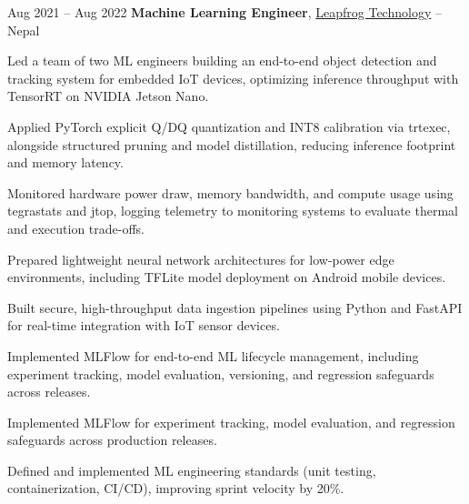         \vspace{0.12 cm}
        \begin{twocolentry}{
            Aug 2021 – Aug 2022
        }
            \textbf{Machine Learning Engineer}, \href{https://www.lftechnology.com/}{Leapfrog Technology} -- Nepal\end{twocolentry}
        \vspace{0.06 cm}
        \begin{onecolentry}
            \begin{highlights}
                \item Led a team of two ML engineers building an end-to-end object detection and tracking system for embedded IoT devices, optimizing inference throughput with TensorRT on NVIDIA Jetson Nano.
                \item Applied PyTorch explicit Q/DQ quantization and INT8 calibration via trtexec, alongside structured pruning and model distillation, reducing inference footprint and memory latency.
                \item Monitored hardware power draw, memory bandwidth, and compute usage using tegrastats and jtop, logging telemetry to monitoring systems to evaluate thermal and execution trade-offs.
                \item Prepared lightweight neural network architectures for low-power edge environments, including TFLite model deployment on Android mobile devices.
                \item Built secure, high-throughput data ingestion pipelines using Python and FastAPI for real-time integration with IoT sensor devices.
                \item Implemented MLFlow for end-to-end ML lifecycle management, including experiment tracking, model evaluation, versioning, and regression safeguards across releases.
                \item Implemented MLFlow for experiment tracking, model evaluation, and regression safeguards across production releases.
                \item Defined and implemented ML engineering standards (unit testing, containerization, CI/CD), improving sprint velocity by 20\%.
            \end{highlights}
        \end{onecolentry}

